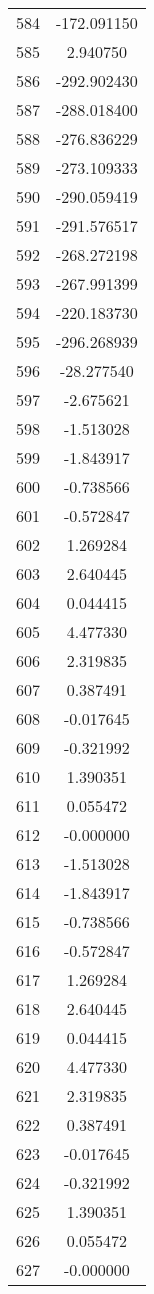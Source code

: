 \documentclass[12pt]{article}
\begin{document}
\begin{longtable}{@{}cc@{}}
584 & -172.091150 \\
585 & 2.940750 \\
586 & -292.902430 \\
587 & -288.018400 \\
588 & -276.836229 \\
589 & -273.109333 \\
590 & -290.059419 \\
591 & -291.576517 \\
592 & -268.272198 \\
593 & -267.991399 \\
594 & -220.183730 \\
595 & -296.268939 \\
596 & -28.277540 \\
597 & -2.675621 \\
598 & -1.513028 \\
599 & -1.843917 \\
600 & -0.738566 \\
601 & -0.572847 \\
602 & 1.269284 \\
603 & 2.640445 \\
604 & 0.044415 \\
605 & 4.477330 \\
606 & 2.319835 \\
607 & 0.387491 \\
608 & -0.017645 \\
609 & -0.321992 \\
610 & 1.390351 \\
611 & 0.055472 \\
612 & -0.000000 \\
613 & -1.513028 \\
614 & -1.843917 \\
615 & -0.738566 \\
616 & -0.572847 \\
617 & 1.269284 \\
618 & 2.640445 \\
619 & 0.044415 \\
620 & 4.477330 \\
621 & 2.319835 \\
622 & 0.387491 \\
623 & -0.017645 \\
624 & -0.321992 \\
625 & 1.390351 \\
626 & 0.055472 \\
627 & -0.000000 \\

\end{longtable}
\end{document}
